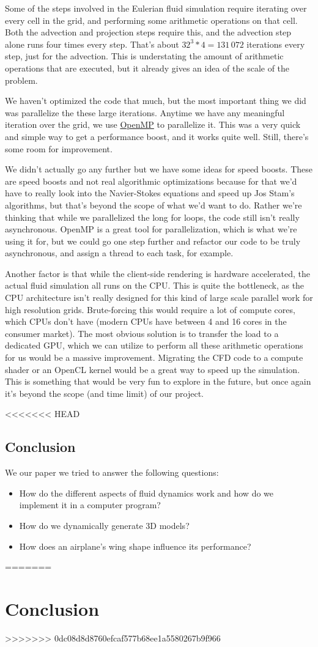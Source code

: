 \documentclass[a4paper,12pt]{article}
\begin{document}
Some of the steps involved in the Eulerian fluid simulation require iterating
over every cell in the grid, and performing some arithmetic operations on that cell.
Both the advection and projection steps require this, and the advection step
alone runs four times every step. That's about $32^3 * 4 = 131\,072$ iterations
every step, just for the advection. This is understating the amount of arithmetic
operations that are executed, but it already gives an idea of the scale of the
problem.

We haven't optimized the code that much, but the most important thing we did was
parallelize the these large iterations. Anytime we have any meaningful iteration
over the grid, we use \href{www.openmp.org}{OpenMP} to parallelize it. This was
a very quick and simple way to get a performance boost, and it works quite well.
Still, there's some room for improvement.

We didn't actually go any further but we have some ideas for speed boosts. These
are speed boosts and not real algorithmic optimizations because for that we'd have
to really look into the Navier-Stokes equations and speed up Jos Stam's algorithms,
but that's beyond the scope of what we'd want to do. Rather we're thinking that
while we parallelized the long for loops, the code still isn't really asynchronous.
OpenMP is a great tool for parallelization, which is what we're using it for,
but we could go one step further and refactor our code to be truly asynchronous,
and assign a thread to each task, for example.

Another factor is that while the client-side rendering is hardware accelerated,
the actual fluid simulation all runs on the CPU. This is quite the bottleneck,
as the CPU architecture isn't really designed for this kind of large scale
parallel work for high resolution grids. Brute-forcing this would require a lot
of compute cores, which CPUs don't have (modern CPUs have between 4 and 16 cores
in the consumer market). The most obvious solution is to transfer the load to
a dedicated GPU, which we can utilize to perform all these arithmetic operations
for us would be a massive improvement. Migrating the CFD code to a compute shader
or an OpenCL kernel would be a great way to speed up the simulation. This is something
that would be very fun to explore in the future, but once again it's beyond the
scope (and time limit) of our project.



<<<<<<< HEAD
\subsection{Conclusion}
We our paper we tried to answer the following questions: 
\begin{itemize}
	\item{How do the different aspects of fluid dynamics work and how do we implement it in a computer program?}
	\item{How do we dynamically generate 3D models?}
	\item{How does an airplane's wing shape influence its performance?}
\end{itemize}
=======
\section{Conclusion}
\ipsum[1]
>>>>>>> 0dc08d8d8760efcaf577b68ee1a5580267b9f966

\nocite{*}
\printbibliography
\end{document}
